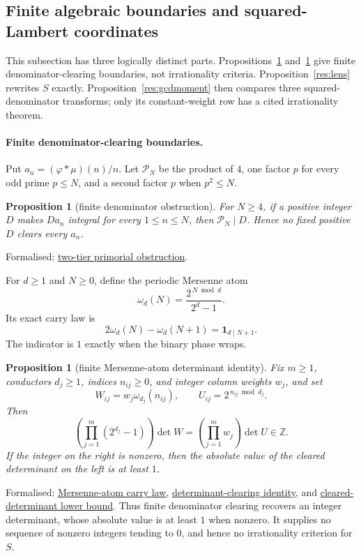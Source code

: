 \documentclass[11pt]{article}
\newcommand{\commit}{99f4bf47422abbd8757cbb22b50ba079d764d3a7}
\newcommand{\repobase}{https://github.com/wcook04/plectis-erdos/blob/\commit}
\newcommand{\PK}{Erdos249257}
\newcommand{\lword}[4]{\href{\repobase/\PK/#1\#L#2}{#4}}
\newtheorem{proposition}[theorem]{Proposition}
\theoremstyle{definition}
\theoremstyle{remark}
\newcommand{\Z}{\mathbb{Z}}
\newcommand{\ph}{\varphi}
\begin{document}
{\subsection{Finite algebraic boundaries and squared-Lambert coordinates}
\label{app:lambert-algebraic}

This subsection has three logically distinct parts.  Propositions~\ref{res:primitiveindex}
and~\ref{res:mersennetailatoms} give finite denominator-clearing boundaries,
not irrationality criteria.  Proposition~\ref{res:lens} rewrites $S$ exactly.
Proposition~\ref{res:gcdmoment} then compares three squared-denominator transforms;
only its constant-weight row has a cited irrationality theorem.

\paragraph{Finite denominator-clearing boundaries.}\label{sec:primitiveindex}
Put \(a_n=(\ph*\mu)(n)/n\).  Let $\mathcal P_N$ be the product of $4$, one factor
$p$ for every odd prime $p\le N$, and a second factor $p$ when $p^2\le N$.
\begin{proposition}[finite denominator obstruction]
\label{res:primitiveindex}
For $N\ge4$, if a positive integer $D$ makes $Da_n$ integral for every
$1\le n\le N$, then $\mathcal P_N\mid D$.  Hence no fixed positive $D$ clears every
$a_n$.
\end{proposition}
\noindent Formalised:
\lword{PrimitiveDeterminantLift.lean}{148}{twoTierPrimorial_dvd_of_integral_jet}{two-tier primorial obstruction}.

For \(d\ge1\) and $N\ge0$, define the periodic Mersenne atom
\[
 \omega_d(N)=\frac{2^{\,N\bmod d}}{2^d-1}.
\]
Its exact carry law is
\[
 2\omega_d(N)-\omega_d(N+1)=\mathbf1_{d\mid N+1}.
\]
The indicator is \(1\) exactly when the binary phase wraps.

\begin{proposition}[finite Mersenne-atom determinant identity]
\label{res:mersennetailatoms}
Fix \(m\ge1\), conductors \(d_j\ge1\), indices \(n_{ij}\ge0\), and integer
column weights \(w_j\), and set
\[
 W_{ij}=w_j\omega_{d_j}(n_{ij}),
 \qquad U_{ij}=2^{\,n_{ij}\bmod d_j}.
\]
Then
\[
 \left(\prod_{j=1}^m(2^{d_j}-1)\right)\det W
 =\left(\prod_{j=1}^m w_j\right)\det U\in\Z.
\]
If the integer on the right is nonzero, then the absolute value of the
cleared determinant on the left is at least \(1\).
\end{proposition}
\noindent Formalised:
\lword{MersenneTailAtoms.lean}{28}{mersenneTailAtom_step}{Mersenne-atom carry law},
\lword{MersenneTailAtoms.lean}{158}{weightedMersenneAtom_denominatorProduct_mul_det}{determinant-clearing identity},
and
\lword{MersenneTailAtoms.lean}{181}{one_le_abs_weightedMersenneAtom_cleared_det}{cleared-determinant lower bound}.
Thus finite denominator clearing recovers an integer determinant, whose
absolute value is at least $1$ when nonzero.  It supplies no sequence of
nonzero integers tending to $0$, and hence no irrationality criterion for \(S\).

}
\end{document}
